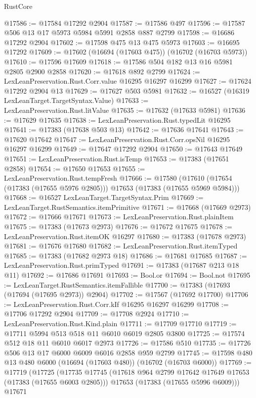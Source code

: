 \begin{lexlean}{RustCore}
\begin{coremodule}
@17586 := @17584 @17292 @2904
@17587 := @17586 @497
@17596 := @17587 @506 @13 @17 @5973 @5984 @5991 @2858 @887 @2799
@17598 := @16686 @17292 @2904
@17602 := @17598 @475 @13 @475 @5973
@17603 := @16695 @17292
@17609 := @17602 (@16694 (@17603 @475)) (@16702 (@16703 @5973))
@17610 := @17596 @17609
@17618 := @17586 @504 @182 @13 @16 @5981 @2805 @2900 @2858
@17620 := @17618 @892 @2799
@17624 := LexLeanPreservation.Rust.Corr.value @16295 @16297 @16299
@17627 := @17624 @17292 @2904 @13
@17629 := @17627 @503 @5981
@17632 := @16527 (@16319 LexLeanTarget.TargetSyntax.Value)
@17633 := LexLeanPreservation.Rust.litValue
@17635 := @17632 (@17633 @5981)
@17636 := @17629 @17635
@17638 := LexLeanPreservation.Rust.typedLit @16295
@17641 := @17383 (@17638 @503 @13)
@17642 := @17636 @17641
@17643 := @17620 @17642
@17647 := LexLeanPreservation.Rust.Corr.opsNil @16295 @16297 @16299
@17649 := @17647 @17292 @2904
@17650 := @17643 @17649
@17651 := LexLeanPreservation.Rust.isTemp
@17653 := @17383 (@17651 @2858)
@17654 := @17650 @17653
@17655 := LexLeanPreservation.Rust.tempFresh
@17666 := @17580
    (@17610 (@17654 (@17383 (@17655 @5976 @2805))) @17653 (@17383 (@17655 @5969 @5984)))
@17668 := @16527 LexLeanTarget.TargetSyntax.Prim
@17669 := LexLeanTarget.RustSemantics.itemPrimitive
@17671 := @17668 (@17669 @2973)
@17672 := @17666 @17671
@17673 := LexLeanPreservation.Rust.plainItem
@17675 := @17383 (@17673 @2973)
@17676 := @17672 @17675
@17678 := LexLeanPreservation.Rust.itemOK @16297
@17680 := @17383 (@17678 @2973)
@17681 := @17676 @17680
@17682 := LexLeanPreservation.Rust.itemTyped
@17685 := @17383 (@17682 @2973 @18)
@17686 := @17681 @17685
@17687 := LexLeanPreservation.Rust.primTyped
@17691 := @17383 (@17687 @213 @18 @11)
@17692 := @17686 @17691
@17693 := Bool.or
@17694 := Bool.not
@17695 := LexLeanTarget.RustSemantics.itemFallible
@17700 := @17383 (@17693 (@17694 (@17695 @2973)) @2904)
@17702 := @17567 (@17692 @17700)
@17706 := LexLeanPreservation.Rust.Corr.kIf @16295 @16297 @16299
@17708 := @17706 @17292 @2904
@17709 := @17708 @2924
@17710 := LexLeanPreservation.Rust.Kind.plain
@17711 := @17709 @17710
@17719 := @17711 @5994 @513 @518 @11 @6010 @6019 @2805 @3800
@17725 := @17574 @512 @18 @11 @6010 @6017 @2973
@17726 := @17586 @510
@17735 := @17726 @506 @13 @17 @6000 @6009 @6016 @2858 @959 @2799
@17745 := @17598 @480 @13 @480 @6000 (@16694 (@17603 @480)) (@16702 (@16703 @6000))
@17769 := @17719
    (@17725
      (@17735
        @17745
        (@17618 @964 @2799 @17642 @17649 @17653 (@17383 (@17655 @6003 @2805)))
        @17653
        (@17383 (@17655 @5996 @6009)))
      @17671

\end{coremodule}
\end{lexlean}

